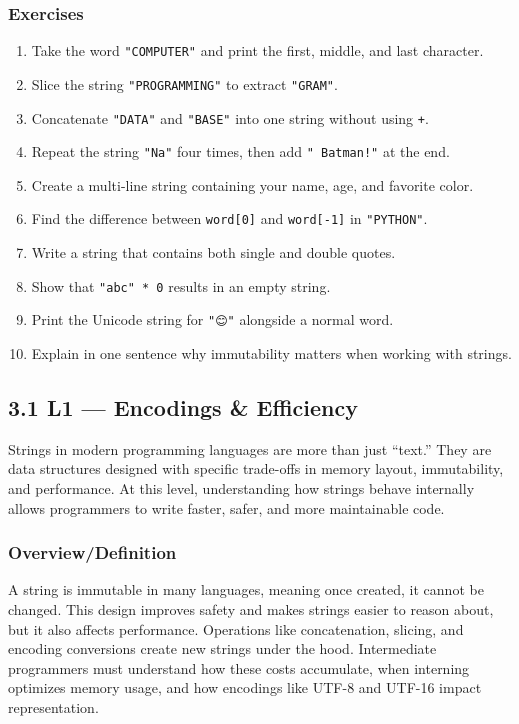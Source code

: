 \documentclass[
  letterpaper,
  DIV=11,
  numbers=noendperiod]{scrreprt}
\providecommand{\tightlist}{%
  \setlength{\itemsep}{0pt}\setlength{\parskip}{0pt}}
\begin{document}
\subsubsection{Exercises}\label{exercises-30}

\begin{enumerate}
\def\labelenumi{\arabic{enumi}.}
\tightlist
\item
  Take the word \texttt{"COMPUTER"} and print the first, middle, and
  last character.
\item
  Slice the string \texttt{"PROGRAMMING"} to extract \texttt{"GRAM"}.
\item
  Concatenate \texttt{"DATA"} and \texttt{"BASE"} into one string
  without using \texttt{+}.
\item
  Repeat the string \texttt{"Na"} four times, then add
  \texttt{"\ Batman!"} at the end.
\item
  Create a multi-line string containing your name, age, and favorite
  color.
\item
  Find the difference between \texttt{word{[}0{]}} and
  \texttt{word{[}-1{]}} in \texttt{"PYTHON"}.
\item
  Write a string that contains both single and double quotes.
\item
  Show that \texttt{"abc"\ *\ 0} results in an empty string.
\item
  Print the Unicode string for \texttt{"😊"} alongside a normal word.
\item
  Explain in one sentence why immutability matters when working with
  strings.
\end{enumerate}

\subsection{3.1 L1 --- Encodings \&
Efficiency}\label{l1-encodings-efficiency}

Strings in modern programming languages are more than just ``text.''
They are data structures designed with specific trade-offs in memory
layout, immutability, and performance. At this level, understanding how
strings behave internally allows programmers to write faster, safer, and
more maintainable code.

\subsubsection{Overview/Definition}\label{overviewdefinition}

A string is immutable in many languages, meaning once created, it cannot
be changed. This design improves safety and makes strings easier to
reason about, but it also affects performance. Operations like
concatenation, slicing, and encoding conversions create new strings
under the hood. Intermediate programmers must understand how these costs
accumulate, when interning optimizes memory usage, and how encodings
like UTF-8 and UTF-16 impact representation.
\end{document}
